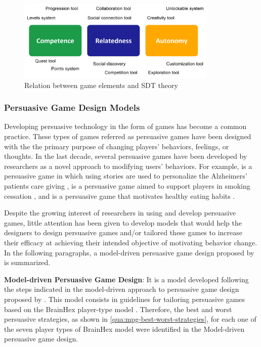 \begin{figure}[htb]
 \caption{Relation between game elements and SDT theory}
 \label{fig:sdt-game-elements}
 \centering
 \includegraphics[width=0.85\textwidth]{images/chap-general-background/sdt-game-elements.png}
 \fautor
\end{figure}

\subsubsection{Persuasive Game Design Models}
\label{subsub:persuasive-game-design-models}

Developing persuasive technology in the form of games has become a common practice. These types of games referred as persuasive games have been designed with the the primary purpose of changing  players' behaviors, feelings, or thoughts. In the last decade, several persuasive games have been developed by researchers as a novel approach to modifying users' behaviors. For example,  is a persuasive game in which using stories are used to personalize the Alzheimers' patients care giving \cite{CadamuroVisch2013},  is a persuasive game aimed to support players in smoking cessation \cite{KhaledBarrNobleFischerBiddle2007a}, and  is a persuasive
game that motivates healthy eating habits \cite{GrimesKantrooGrinter2010}.

Despite the growing interest of researchers in using and develop persuasive games, little attention has been given to develop models that would help the designers to design persuasive games and/or tailored these games to increase their efficacy at achieving their intended objective of motivating behavior change. In the following paragraphs, a model-driven persuasive game design proposed by \cite{OrjiVassilevaMandryk2014} is summarized.

\textbf{Model-driven Persuasive Game Design}: It is a model developed following the steps indicated in the model-driven approach to persuasive game design proposed by \cite{Orji2014}. This model consists in guidelines for tailoring persuasive games based on the BrainHex player-type model \cite{NackeBatemanMandryk2014}. Therefore, the best and worst persuasive strategies, as shown in \autoref{qua:mpg-best-worst-strategies}, for each one of the seven player types of BrainHex model were identified in the Model-driven persuasive game design.



